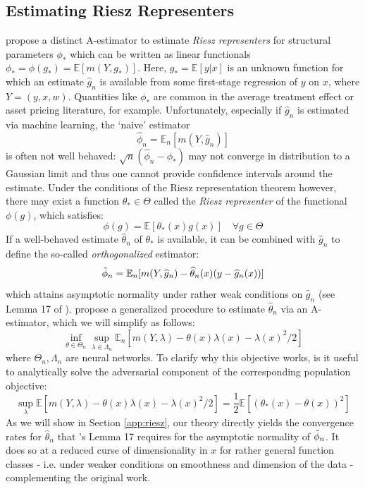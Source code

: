 \documentclass[12pt]{article}
\theoremstyle{myplain}
\theoremstyle{definition}
\theoremstyle{definition}
\theoremstyle{remark}
\numberwithin{equation}{section}
\begin{document}
\subsection{Estimating Riesz Representers}
\label{ex:riesz}

\cite{chernozhukov2020adversarial} propose a distinct A-estimator to estimate {\it Riesz representers} for structural parameters $\phi_*$ which can be written as linear functionals $\phi_*=\phi(g_*)=\mathbb{E}[m(Y,g_*)]$. Here, $g_*=\mathbb{E}[y|x]$ is an unknown function for which an estimate $\widehat{g}_n$ is available from some first-stage regression of $y$ on $x$, where $Y=(y,x,w)$. Quantities like $\phi_*$ are common in the average treatment effect or asset pricing literature, for example. Unfortunately, especially if $\widehat{g}_n$ is estimated via machine learning, the `naive' estimator 
$$\widehat{\phi}_n=\mathbb{E}_n[m(Y,\widehat{g}_n)]$$
is often not well behaved: $\sqrt{n}(\widehat{\phi}_n-\phi_*)$ may not converge in distribution to a Gaussian limit and thus one cannot provide confidence intervals around the estimate. Under the conditions of the Riesz representation theorem however, there may exist a function $\theta_*\in\Theta$ called the {\it Riesz representer} of the functional $\phi(g)$, which satisfies:
$$\phi(g)=\mathbb{E}[\theta_*(x)g(x)] \quad \forall g\in\Theta$$
If a well-behaved estimate $\widehat\theta_n$ of $\theta_*$ is available, it can be combined with $\widehat{g}_n$ to define the so-called {\it orthogonalized} estimator:
$$\Tilde\phi_n = \mathbb{E}_n[m(Y,\widehat{g}_n)-\widehat\theta_n(x)(y-\widehat{g}_n(x))]$$
which attains asymptotic normality under rather weak conditions on $\widehat{g}_n$ (see Lemma 17 of \cite{chernozhukov2020adversarial}). \cite{chernozhukov2020adversarial} propose a generalized procedure to estimate $\widehat\theta_n$ via an A-estimator, which we will simplify as follows:
$$\inf_{\theta\in\Theta_n}\sup_{\lambda\in\Lambda_n}\mathbb{E}_n[m(Y,\lambda)-\theta(x)\lambda(x)-\lambda(x)^2/2]$$
where $\Theta_n,\Lambda_n$ are neural networks. To clarify why this objective works, is it useful to analytically solve the adversarial component of the corresponding population objective: $$\sup_\lambda\mathbb{E}[m(Y,\lambda)-\theta(x)\lambda(x)-\lambda(x)^2/2]=\frac{1}{2}\mathbb{E}[(\theta_*(x)-\theta(x))^2]$$
As we will show in Section \ref{app:riesz}, our theory directly yields the convergence rates for $\widehat\theta_n$ that \cite{chernozhukov2020adversarial}'s Lemma 17 requires for the asymptotic normality of $\Tilde\phi_n$. It does so at a reduced curse of dimensionality in $x$ for rather general function classes - i.e. under weaker conditions on smoothness and dimension of the data - complementing the original work.
\end{document}
